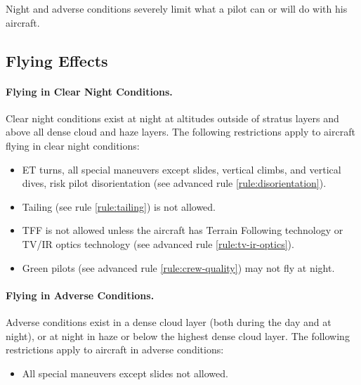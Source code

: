 \begin{advancedrules}
{Night and adverse conditions severely limit what a pilot can or will do with his aircraft.

\subsection{Flying Effects}

\paragraph{Flying in Clear Night Conditions.}

Clear night conditions exist at night at altitudes outside of stratus layers and above all dense cloud and haze layers. The following restrictions apply to aircraft flying in clear night conditions:

\begin{itemize}

    \item{} ET turns, all special maneuvers except slides, vertical climbs, and vertical dives, risk pilot disorientation (see advanced rule \ref{rule:disorientation}).

    \item{} Tailing (see rule \ref{rule:tailing}) is not allowed.
    
    \item{} TFF is not allowed unless the aircraft has Terrain Following technology or TV/IR optics technology (see advanced rule \ref{rule:tv-ir-optics}).

    \item{} Green pilots (see advanced rule \ref{rule:crew-quality}) may not fly at night.

\end{itemize}

\paragraph{Flying in Adverse Conditions.}

Adverse conditions exist in a dense cloud layer (both during the day and at night), or at night in haze or below the highest dense cloud layer. The following restrictions apply to aircraft in adverse conditions:

\begin{itemize}

    \item{} All special maneuvers except slides not allowed.


\end{itemize}}
\end{advancedrules}
